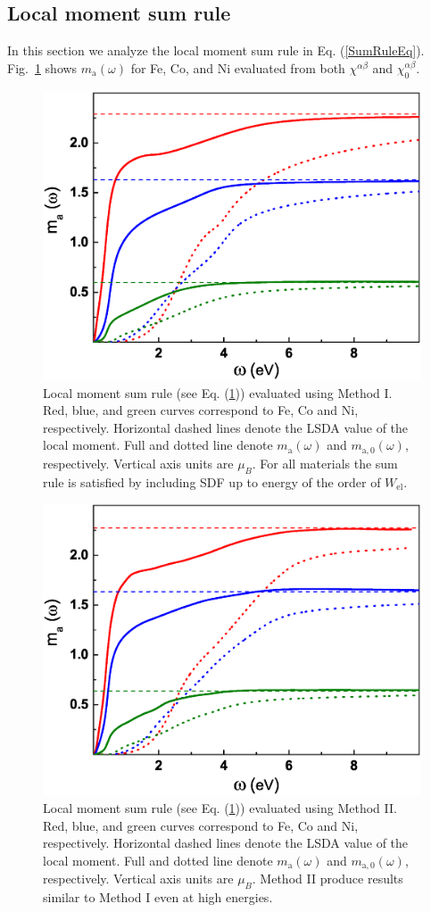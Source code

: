\subsection{Local moment sum rule}

In this section we analyze the local moment sum rule in Eq. (\ref{SumRuleEq}). Fig.~\ref{SumRule} shows $m_{\text{a}}(\omega)$ for Fe, Co, and Ni evaluated from both $\chi^{\alpha\beta}$ and $\chi_0^{\alpha\beta}$.

\begin{figure}[h!]
\centering
\includegraphics[width=0.55\hsize]{Chapters/TDDFT/figures/Article/SumRule.eps}
\caption{Local moment sum rule (see Eq. (\ref{SumRule})) evaluated using Method I. Red, blue, and green curves correspond to Fe, Co and Ni, respectively. Horizontal dashed lines denote the LSDA value of the local moment. Full and dotted line denote $m_{\text{a}}(\omega)$ and $m_{\text{a},0}(\omega)$, respectively. Vertical axis units are $\mu_B$. For all materials the sum rule is satisfied by including SDF up to energy of the order of $W_{\text{el}}$.}
\label{SumRule}
\end{figure} 

\begin{figure}[h!]
\centering
\includegraphics[width=0.55\hsize]{Chapters/TDDFT/figures/Article/SumRuleElk.eps}
\caption{Local moment sum rule (see Eq. (\ref{SumRule})) evaluated using Method II. Red, blue, and green curves correspond to Fe, Co and Ni, respectively. Horizontal dashed lines denote the LSDA value of the local moment. Full and dotted line denote $m_{\text{a}}(\omega)$ and $m_{\text{a},0}(\omega)$, respectively. Vertical axis units are $\mu_B$. Method II produce results similar to Method I even at high energies.}
\label{SumRuleElk}
\end{figure} 

